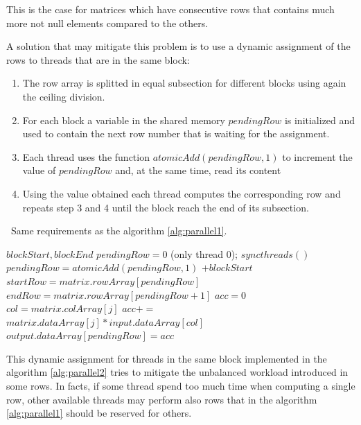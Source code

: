 \documentclass[conference]{IEEEtran}
\begin{document}
This is the case for matrices which have consecutive rows that contains much more not null elements compared to the others.

A solution that may mitigate this problem is to use a dynamic assignment of the rows to threads that are in the same block:
\begin{enumerate}
    \item The row array is splitted in equal subsection for different blocks using again the ceiling division. 
    \item For each block a variable in the shared memory $pendingRow$ is initialized and used to contain the next row number that is waiting for the assignment. 
    \item Each thread uses the function $atomicAdd(pendingRow,1)$ to increment the value of $pendingRow$ and, at the same time, read its content
    \item Using the value obtained each thread computes the corresponding row and repeats step 3 and 4 until the block reach the end of its subsection. 
\end{enumerate}

\begin{algorithm}[h!]
\caption{Second parallelization for the SpVM algorithm}
\algorithmicrequire~Same requirements as the algorithm \ref{alg:parallel1}.
\begin{algorithmic}[1]
\State $blockStart,blockEnd$ 
\State $pendingRow=0$ \Comment(only thread 0);
\State $syncthreads()$
\State $pendingRow=atomicAdd(pendingRow,1)$
\State $+blockStart$
 \Return \EndIf
\State $startRow=matrix.rowArray[pendingRow]$
\State $endRow=matrix.rowArray[pendingRow+1]$
\State $acc=0$
\State $col=matrix.colArray[j]$
\State $acc+=$
\State $matrix.dataArray[j]*input.dataArray[col]$
\EndFor
\State $output.dataArray[pendingRow]=acc$
\EndWhile
\EndProcedure
\end{algorithmic}
\label{alg:parallel2}
\end{algorithm}

This dynamic assignment for threads in the same block implemented in the algorithm \ref{alg:parallel2} tries to mitigate the unbalanced workload introduced in some rows. 
In facts, if some thread spend too much time when computing a single row, other available threads may perform also rows that in the algorithm \ref{alg:parallel1} should be reserved for others.  
\end{document}
